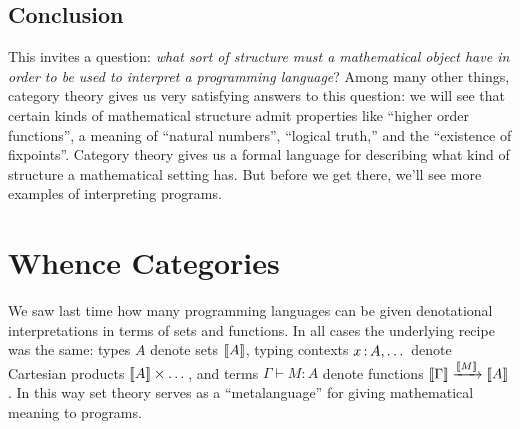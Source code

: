 
\section{Conclusion}

This invites a question: \emph{what sort of structure must a mathematical object
have in order to be used to interpret a programming language}?
Among many other things, category theory gives us very satisfying answers to this question:
we will see that certain kinds of mathematical structure admit
properties like ``higher order functions'', a meaning of ``natural numbers'',
 ``logical truth,'' and the ``existence of fixpoints''. Category theory gives us a formal language for describing what kind of
structure a mathematical setting has. But before we get there, we'll see
more examples of interpreting programs.



\chapter{Whence Categories}

We saw last time how many programming languages can be given denotational
interpretations in terms of sets and functions.
In all cases the underlying recipe was the same:
types \(A\) denote sets \(\left\llbracket A\right\rrbracket\),
typing contexts \(x\,{:}\, A,\dots\) denote Cartesian products \(\left\llbracket A\right\rrbracket \times \dots\),
and terms \(\Gamma \vdash M : A\)
denote functions \(\left\llbracket \Gamma\right\rrbracket \xrightarrow{\left\llbracket M\right\rrbracket} \left\llbracket A\right\rrbracket\).
In this way set theory serves as a ``metalanguage'' for giving mathematical meaning to programs.

